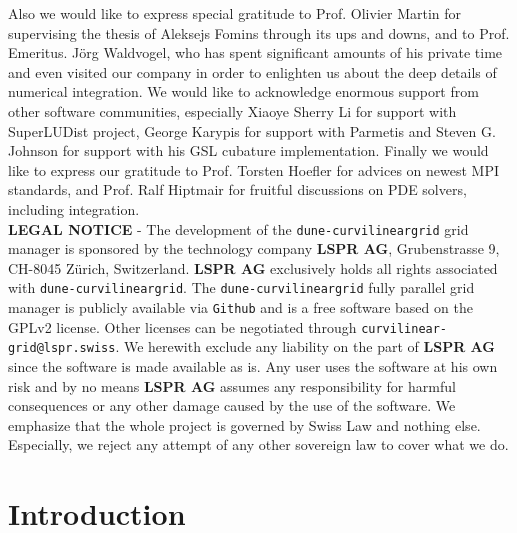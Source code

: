 \documentclass[a4paper,11pt]{article}
\newcommand{\curvgrid}{\setlength\emergencystretch{3cm}\texttt{dune-curvilineargrid}}
\begin{document}
\noindent
Also we would like to express special gratitude to Prof. Olivier Martin for supervising the thesis of Aleksejs Fomins through its ups and downs, and to Prof. Emeritus. J\"org Waldvogel, who has spent significant amounts of his private time and even visited our company in order to enlighten us about the deep details of numerical integration. We would like to acknowledge enormous support from other software communities, especially Xiaoye Sherry Li for support with SuperLUDist project, George Karypis for support with Parmetis and Steven G. Johnson for support with his GSL cubature implementation. Finally we would like to express our gratitude to Prof. Torsten Hoefler for advices on newest MPI standards, and Prof. Ralf Hiptmair for fruitful discussions on PDE solvers, including integration. \\





\vspace{20mm}
{\small
\noindent \textbf{LEGAL NOTICE} - The development of the \curvgrid{} grid manager is sponsored by the technology company \textbf{LSPR AG}, Grubenstrasse 9, CH-8045 Z\"urich, Switzerland. \textbf{LSPR AG} exclusively holds all rights associated with \curvgrid{}.
The \curvgrid{} fully parallel grid manager is publicly available via \texttt{Github} and is a free software based on the GPLv2 license. Other licenses can be negotiated through \texttt{curvilinear-grid@lspr.swiss}.
We herewith exclude any liability on the part of \textbf{LSPR AG} since the software is made available as is. Any user uses the software at his own risk and by no means \textbf{LSPR AG} assumes any responsibility for harmful consequences or any other damage caused by the use of the software. We emphasize that the whole project is governed by Swiss Law and nothing else. Especially, we reject any attempt of any other sovereign law to cover what we do.
}


\tableofcontents


\newpage
\section{Introduction}
\end{document}
